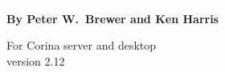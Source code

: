 \begin{titlepage}
\AddToShipoutPicture*{\BackgroundPic}




\includegraphics{Images/pixel.png}\\[187mm] 
{
\raggedleft
\Large \textbf{By Peter W.\ Brewer and Ken Harris}\\
}

\vfill
{
\large For Corina server and desktop\\
version 2.12\\[4mm]
}



\end{titlepage}